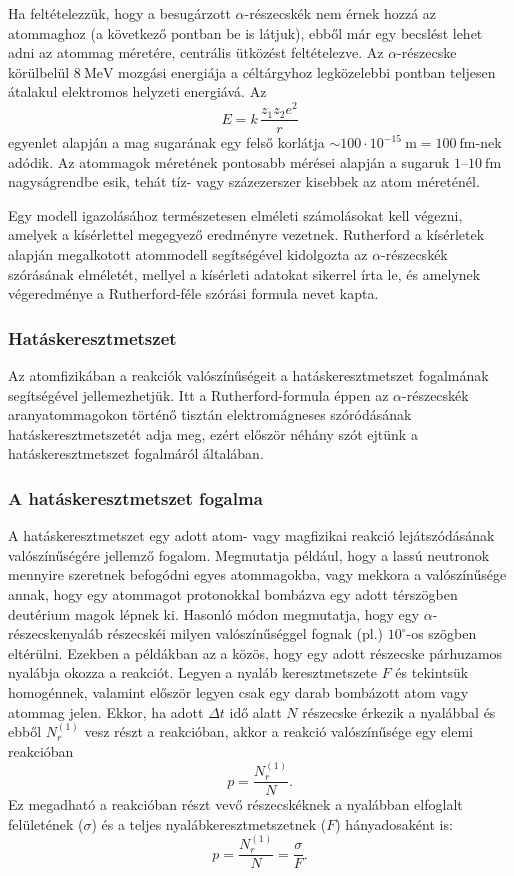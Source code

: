 \documentclass[a4paper,12pt]{article}
\begin{document}
Ha feltételezzük, hogy a besugárzott $\alpha$-részecskék nem érnek
hozzá az atommaghoz (a következő pontban be is látjuk), ebből már egy
becslést lehet adni az atommag méretére, centrális ütközést feltételezve.
Az $\alpha$-részecske körülbelül $8\ \mathrm{MeV}$ mozgási energiája a
céltárgyhoz legközelebbi pontban teljesen átalakul elektromos helyzeti
energiává.
Az
\[
E = k\,\frac{z_1 z_2 e^2}{r}
\]
egyenlet alapján a mag sugarának egy felső korlátja
$\sim 100\cdot 10^{-15}\ \mathrm{m} = 100\ \mathrm{fm}$-nek adódik.
Az atommagok méretének pontosabb mérései alapján a sugaruk
$1$--$10\ \mathrm{fm}$ nagyságrendbe esik, tehát tíz- vagy
százezerszer kisebbek az atom méreténél.

Egy modell igazolásához természetesen elméleti számolásokat kell végezni,
amelyek a kísérlettel megegyező eredményre vezetnek.
Rutherford a kísérletek alapján megalkotott atommodell segítségével
kidolgozta az $\alpha$-részecskék szórásának elméletét, mellyel a
kísérleti adatokat sikerrel írta le, és amelynek végeredménye a
Rutherford-féle szórási formula nevet kapta.

\subsubsection{Hatáskeresztmetszet}
Az atomfizikában a reakciók valószínűségeit a hatáskeresztmetszet
fogalmának segítségével jellemezhetjük.
Itt a Rutherford-formula éppen az $\alpha$-részecskék aranyatommagokon
történő tisztán elektromágneses szóródásának hatáskeresztmetszetét adja
meg, ezért először néhány szót ejtünk a hatáskeresztmetszet fogalmáról
általában.

\subsubsection*{A hatáskeresztmetszet fogalma}
A hatáskeresztmetszet egy adott atom- vagy magfizikai reakció
lejátszódásának valószínűségére jellemző fogalom.
Megmutatja például, hogy a lassú neutronok mennyire szeretnek befogódni
egyes atommagokba, vagy mekkora a valószínűsége annak, hogy egy
atommagot protonokkal bombázva egy adott térszögben deutérium magok
lépnek ki.
Hasonló módon megmutatja, hogy egy $\alpha$-részecskenyaláb részecskéi
milyen valószínűséggel fognak (pl.) $10^\circ$-os szögben eltérülni.
Ezekben a példákban az a közös, hogy egy adott részecske párhuzamos
nyalábja okozza a reakciót.
Legyen a nyaláb keresztmetszete $F$ és tekintsük homogénnek, valamint
először legyen csak egy darab bombázott atom vagy atommag jelen.
Ekkor, ha adott $\Delta t$ idő alatt $N$ részecske érkezik a nyalábbal
és ebből $N_r^{(1)}$ vesz részt a reakcióban, akkor a reakció
valószínűsége egy elemi reakcióban
\[
p=\frac{N_r^{(1)}}{N}.
\]
Ez megadható a reakcióban részt vevő részecskéknek a nyalábban
elfoglalt felületének ($\sigma$) és a teljes nyalábkeresztmetszetnek
($F$) hányadosaként is:
\[
p=\frac{N_r^{(1)}}{N}=\frac{\sigma}{F}.
\]
\end{document}
